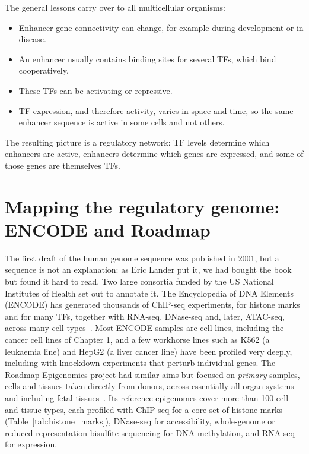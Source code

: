 The general lessons carry over to all multicellular organisms:
\begin{itemize}
  \item Enhancer-gene connectivity can change, for example during development or in disease.
  \item An enhancer usually contains binding sites for several TFs, which bind cooperatively.
  \item These TFs can be activating or repressive.
  \item TF expression, and therefore activity, varies in space and time, so the same enhancer sequence is active in some cells and not others.
\end{itemize}
The resulting picture is a regulatory network: TF levels determine which enhancers are active, enhancers determine which genes are expressed, and some of those genes are themselves TFs.

\section{Mapping the regulatory genome: ENCODE and Roadmap}
\label{sec:consortia}

The first draft of the human genome sequence was published in 2001, but a sequence is not an explanation: as Eric Lander put it, we had bought the book but found it hard to read. Two large consortia funded by the US National Institutes of Health set out to annotate it. The Encyclopedia of DNA Elements (ENCODE) has generated thousands of ChIP-seq experiments, for histone marks and for many TFs, together with RNA-seq, DNase-seq and, later, ATAC-seq, across many cell types~\citep{encode2012}. Most ENCODE samples are cell lines, including the cancer cell lines of Chapter 1, and a few workhorse lines such as K562 (a leukaemia line) and HepG2 (a liver cancer line) have been profiled very deeply, including with knockdown experiments that perturb individual genes. The Roadmap Epigenomics project had similar aims but focused on \emph{primary} samples, cells and tissues taken directly from donors, across essentially all organ systems and including fetal tissues~\citep{roadmap2015}. Its reference epigenomes cover more than 100 cell and tissue types, each profiled with ChIP-seq for a core set of histone marks (Table~\ref{tab:histone_marks}), DNase-seq for accessibility, whole-genome or reduced-representation bisulfite sequencing for DNA methylation, and RNA-seq for expression.

